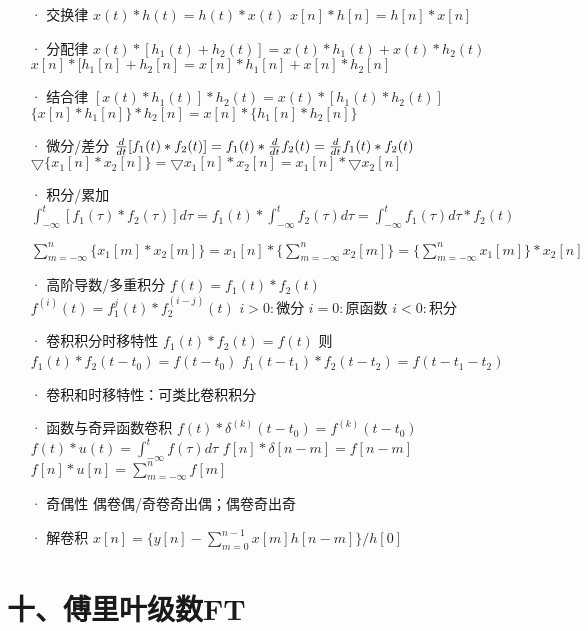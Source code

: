 \begin{itemize}
\item[·] 交换律    $x(t)*h(t)=h(t)*x(t)$            $x[n]*h[n]=h[n]*x[n]$

\item[·] 分配律    $x(t)*[h_1(t)+h_2(t)]=x(t)*h_1(t)+x(t)*h_2(t)$  $x[n]*[h_1[n]+h_2[n]=x[n]*h_1[n]+x[n]*h_2[n]$

\item[·] 结合律   $[x(t)*h_1(t)]*h_2(t)=x(t)*[h_1(t)*h_2(t)]$       $\{x[n]*h_1[n]\}*h_2[n]=x[n]*\{h_1[n]*h_2[n]\}$

\item[·] 微分/差分
${d\over dt}[f_1(t)*f_2(t)]=f_1(t)*{d\over dt}f_2(t)={d\over dt}f_1(t)*f_2(t) $  $\bigtriangledown\{x_1[n]*x_2[n]\}=\bigtriangledown x_1[n]*x_2[n]=x_1[n]*\bigtriangledown x_2[n] $

\item[·] 积分/累加
$\int^t_{-\infty}[f_1(\tau)*f_2(\tau)]d\tau=f_1(t)*\int^t_{-\infty}f_2(\tau)d\tau=\int^t_{-\infty}f_1(\tau)d\tau*f_2(t)$

 $\sum^n_{m=-\infty}\{x_1[m]*x_2[m]\}=x_1[n]*\{\sum^n_{m=-\infty}x_2[m]\}=\{\sum^n_{m=-\infty}x_1[m]\}*x_2[n]$

\item[·] 高阶导数/多重积分
$f(t)=f_1(t)*f_2(t)$    $f^{(i)}(t)=f_1^j(t)*f_2^{(i-j)}(t)$
$i>0 : 微分$     $i=0 : 原函数$      $i<0 : 积分$

\item[·] 卷积积分时移特性
$f_1(t)*f_2(t)=f(t)$   则
$f_1(t)*f_2(t-t_0)=f(t-t_0)$    $f_1(t-t_1)*f_2(t-t_2)=f(t-t_1-t_2)$

\item[·] 卷积和时移特性：可类比卷积积分

\item[·] 函数与奇异函数卷积
$f(t)*\delta^{(k)}(t-t_0)=f^{(k)}(t-t_0)$      $f(t)*u(t)=\int^t_{-\infty}f(\tau)d\tau$
$f[n]*\delta[n-m]=f[n-m]$      $f[n]*u[n]=\sum^n_{m=-\infty}f[m]$

\item[·] 奇偶性
偶卷偶/奇卷奇出偶；偶卷奇出奇

\item[·] 解卷积
$x[n]=\{y[n]-\sum^{n-1}_{m=0}x[m]h[n-m]\}/h[0]$
\end{itemize}

\section*{十、傅里叶级数FT}

